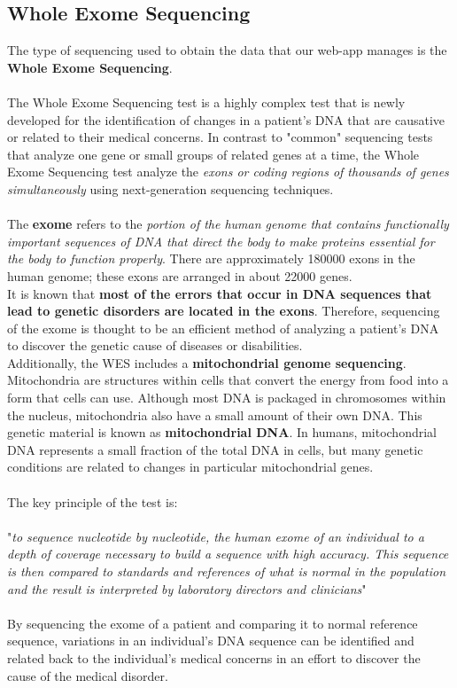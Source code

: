 \subsection{Whole Exome Sequencing}
The type of sequencing used to obtain the data that our web-app manages is the \textbf{Whole Exome Sequencing}.
\\
\\The Whole Exome Sequencing test is a highly complex test that is newly developed for the identification of changes in a patient's DNA that are causative or related to their medical concerns. In contrast to "common" sequencing tests that analyze one gene or small groups of related genes at a time, the Whole Exome Sequencing test analyze the \emph{exons or coding regions of thousands of genes simultaneously} using next-generation sequencing techniques.
\\
\\The \textbf{exome} refers to the \emph{portion of the human genome that contains functionally important sequences of DNA that direct the body to make proteins essential for the body to function properly}. There are approximately 180000 exons in the human genome; these exons are arranged in about 22000 genes.
\\It is known that \textbf{most of the errors that occur in DNA sequences that lead to genetic disorders are located in the exons}. Therefore, sequencing of the exome is thought to be an efficient method of analyzing a patient's DNA to discover the genetic cause of diseases or disabilities.
\\Additionally, the WES includes a \textbf{mitochondrial genome sequencing}. Mitochondria are structures within cells that convert the energy from food into a form that cells can use. Although most DNA is packaged in chromosomes within the nucleus, mitochondria also have a small amount of their own DNA. This genetic material is known as \textbf{mitochondrial DNA}. In humans, mitochondrial DNA represents a small fraction of the total DNA in cells, but many genetic conditions are related to changes in particular mitochondrial genes.
\\
\\
The key principle of the test is:
\\
\\ "\emph{to sequence nucleotide by nucleotide, the human exome of an individual to a depth of coverage necessary to build a sequence with high accuracy. This sequence is then compared to standards and references of what is normal in the population and the result is interpreted by laboratory directors and clinicians}"
\\
\\ By sequencing the exome of a patient and comparing it to normal reference sequence, variations in an individual's DNA sequence can be identified and related back to the individual's medical concerns in an effort to discover the cause of the medical disorder.


